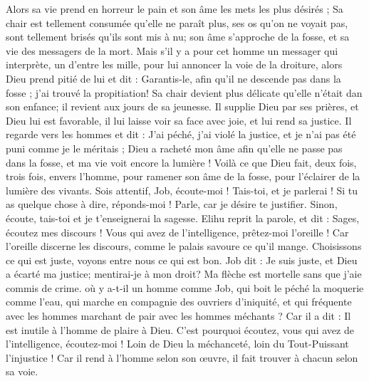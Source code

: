 \begin{multicols}{2}
Alors sa vie prend en horreur le pain et son âme les mets les plus désirés ;
Sa chair est tellement consumée qu'elle ne paraît plus, ses os qu'on ne voyait pas, sont tellement brisés qu'ils sont mis à nu;
son âme s'approche de la fosse, et sa vie des messagers de la mort.
Mais s'il y a pour cet homme un messager qui interprète, un d'entre les mille, pour lui annoncer la voie de la droiture,
alors Dieu prend pitié de lui et dit : Garantis-le, afin qu'il ne descende pas dans la fosse ; j'ai trouvé la propitiation!
Sa chair devient plus délicate qu'elle n'était dan son enfance; il revient aux jours de sa jeunesse.
Il supplie Dieu par ses prières, et Dieu lui est favorable, il lui laisse voir sa face avec joie, et lui rend sa justice.
Il regarde vers les hommes et dit : J'ai péché, j'ai violé la justice, et je n'ai pas été puni comme je le méritais ;
Dieu a racheté mon âme afin qu'elle ne passe pas dans la fosse, et ma vie voit encore la lumière !
Voilà ce que Dieu fait, deux fois, trois fois, envers l'homme,
pour ramener son âme de la fosse, pour l'éclairer de la lumière des vivants.
Sois attentif, Job, écoute-moi ! Tais-toi, et je parlerai !
Si tu as quelque chose à dire, réponds-moi ! Parle, car je désire te justifier.
Sinon, écoute, tais-toi et je t'enseignerai la sagesse.
\VerseOne{}Elihu reprit la parole, et dit :
Sages, écoutez mes discours ! Vous qui avez de l'intelligence, prêtez-moi l'oreille !
Car l'oreille discerne les discours, comme le palais savoure ce qu'il mange.
Choisissons ce qui est juste, voyons entre nous ce qui est bon.
Job dit : Je suis juste, et Dieu a écarté ma justice;
mentirai-je à mon droit? Ma flèche est mortelle sans que j'aie commis de crime.
où y a-t-il un homme comme Job, qui boit le péché la moquerie comme l'eau,
qui marche en compagnie des ouvriers d'iniquité, et qui fréquente  avec les hommes marchant de pair avec les hommes méchants ?
Car il a dit : Il est inutile à l'homme de plaire à Dieu.
 C'est pourquoi écoutez, vous qui avez de l'intelligence, écoutez-moi ! Loin de Dieu la méchanceté, loin du Tout-Puissant l'injustice !
Car il rend à l'homme selon son œuvre, il fait trouver à chacun selon sa voie.

\end{multicols}
